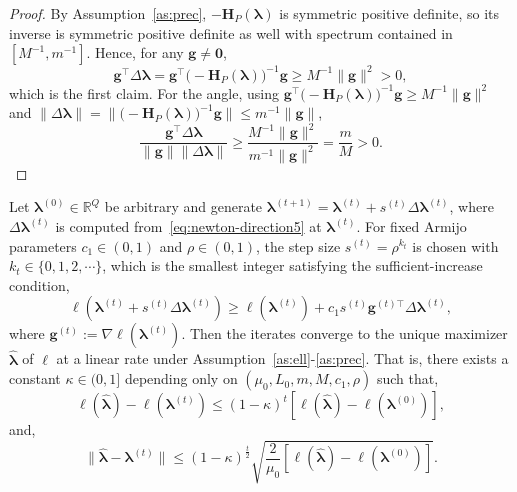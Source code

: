 \begin{proof}
    By Assumption~\ref{as:prec}, $-\mathbf{H}_{P}(\bm{\lambda})$ is symmetric positive definite, so its inverse is symmetric positive definite as well with spectrum contained in $[M^{-1}, m^{-1}]$. Hence, for any $\mathbf{g}\neq \bm{0}$,
    \begin{equation}
        \mathbf{g}^{\top}\Delta\bm{\lambda}=\mathbf{g}^{\top}\bigl(-\mathbf{H}_{P}(\bm{\lambda})\bigr)^{-1}\mathbf{g}\geq M^{-1}\|\mathbf{g}\|^{2}>0,
    \end{equation}
    which is the first claim. For the angle, using $\mathbf{g}^{\top}\bigl(-\mathbf{H}_{P}(\bm{\lambda})\bigr)^{-1}\mathbf{g}\geq M^{-1}\|\mathbf{g}\|^{2}$ and $\|\Delta\bm{\lambda}\|=\|\bigl(-\mathbf{H}_{P}(\bm{\lambda})\bigr)^{-1}\mathbf{g}\|\leq m^{-1}\|\mathbf{g}\|$,
    \begin{equation}
        \frac{\mathbf{g}^{\top}\Delta\bm{\lambda}}{\|\mathbf{g}\|\|\Delta\bm{\lambda}\|}\geq\frac{M^{-1}\|\mathbf{g}\|^{2}}{m^{-1}\|\mathbf{g}\|^{2}}= \frac{m}{M}>0.
    \end{equation}
\end{proof}

\begin{theorem}
    Let $\bm{\lambda}^{(0)}\in \mathbb{R}^{Q}$ be arbitrary and generate $\bm{\lambda}^{(t+1)}=\bm{\lambda}^{(t)}+s^{(t)}\Delta \bm{\lambda}^{(t)}$, where $\Delta \bm{\lambda}^{(t)}$ is computed from~\eqref{eq:newton-direction5} at $\bm{\lambda}^{(t)}$. For fixed Armijo parameters $c_{1}\in(0,1)$ and $\rho\in (0,1)$, the step size $s^{(t)}=\rho^{k_{t}}$ is chosen with $k_{t}\in \{0,1,2,\cdots\}$, which is the smallest integer satisfying the sufficient-increase condition,
    \begin{equation}
        \ell(\bm{\lambda}^{(t)}+s^{(t)}\Delta \bm{\lambda}^{(t)})\geq \ell(\bm{\lambda}^{(t)})+c_{1}s^{(t)}\mathbf{g}^{(t)\top}\Delta \bm{\lambda}^{(t)},
        \label{eq:thm1-1}
    \end{equation}
    where $\mathbf{g}^{(t)}:=\nabla\ell(\bm{\lambda}^{(t)})$. Then the iterates converge to the unique maximizer $\hat{\bm{\lambda}}$ of $\ell$ at a linear rate under Assumption~\ref{as:ell}-\ref{as:prec}. That is, there exists a constant $\kappa\in (0,1]$ depending only on $(\mu_{0},L_{0},m,M,c_{1},\rho)$ such that,
    \begin{equation}
        \ell(\hat{\bm{\lambda}})-\ell(\bm{\lambda}^{(t)})\leq (1-\kappa)^{t}[\ell(\hat{\bm{\lambda}})-\ell(\bm{\lambda}^{(0)})],
        \label{eq:thm1-2}
    \end{equation}
    and,
    \begin{equation}
        \|\hat{\bm{\lambda}}-\bm{\lambda}^{(t)}\|\leq (1-\kappa)^{\frac{t}{2}}\sqrt{\frac{2}{\mu_{0}}[\ell(\hat{\bm{\lambda}})-\ell(\bm{\lambda}^{(0)})]}.
        \label{eq:thm1-3}
    \end{equation}
    \label{thm:convergence}
\end{theorem}

